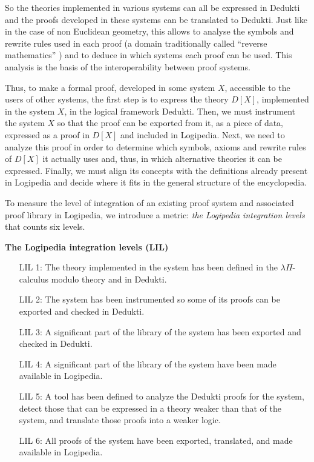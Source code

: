 So the theories implemented in various systems can all be expressed in
Dedukti and the proofs developed in these systems can be translated to
Dedukti. Just like in the case of non Euclidean geometry, this allows
to analyse the symbols and rewrite rules used in each proof
\cite{Thire18,Dowek17} (a domain traditionally called ``reverse
mathematics'' \cite{Friedman76,Simpson09}) and to deduce in which
systems each proof can be used.  This analysis is the basis of the
interoperability between proof systems.


Thus, to make a formal proof, developed in some system $X$, accessible
to the users of other systems, the first step is to express the theory
$D[X]$, implemented in the system $X$, in the logical framework
Dedukti.  Then, we must instrument the system $X$ so that the proof
can be exported from it, as a piece of data, expressed as a proof in
$D[X]$ and included in Logipedia. Next, we need to analyze this proof
in order to determine which symbols, axioms and rewrite rules of
$D[X]$ it actually uses and, thus, in which alternative theories it
can be expressed.  Finally, we must align its concepts with the
definitions already present in Logipedia and decide where it fits in
the general structure of the encyclopedia.

To measure the level of integration of an existing proof system and
associated proof library in Logipedia, we introduce a metric: {\em the
  Logipedia integration levels} that counts six levels.

\begin{framed}
\begin{center}
{\bf The Logipedia integration levels (LIL)\label{lil}}
\end{center}

\begin{itemize}
\item[LIL 1:] The theory implemented in the system has been defined in
  the $\lambda\Pi$-calculus modulo theory and in Dedukti.

\item[LIL 2:] The system has been instrumented so some of its proofs
  can be exported and checked in Dedukti.

\item[LIL 3:] A significant part of the library of the system has been
  exported and checked in Dedukti.

\item[LIL 4:] A significant part of the library of the system have
  been made available in Logipedia.

\item[LIL 5:] A tool has been defined to analyze the Dedukti proofs
  for the system, detect those that can be expressed in a theory
  weaker than that of the system, and translate those proofs into a
  weaker logic.

\item[LIL 6:] All proofs of the system have been exported, translated,
  and made available in Logipedia.
\end{itemize}
\end{framed}

